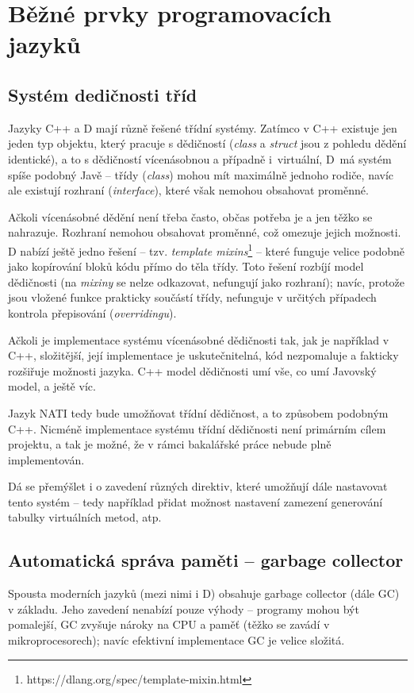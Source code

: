 \section{Běžné prvky programovacích jazyků}

\subsection{Systém dedičnosti tříd} Jazyky C++ a D mají různě řešené třídní systémy. Zatímco v C++ existuje jen jeden typ objektu, který pracuje s dědičností (\textit{class} a \textit{struct} jsou z pohledu dědění identické), a to s dědičností vícenásobnou a případně i~virtuální, D~má systém spíše podobný Javě -- třídy (\textit{class}) mohou mít maximálně jednoho rodiče, navíc ale existují rozhraní (\textit{interface}), které však nemohou obsahovat proměnné.

Ačkoli vícenásobné dědění není třeba často, občas potřeba je a jen těžko se nahrazuje. Rozhraní nemohou obsahovat proměnné, což omezuje jejich možnosti. D nabízí ještě jedno řešení -- tzv. \textit{template mixins}\footnote{https://dlang.org/spec/template-mixin.html} -- které funguje velice podobně jako kopírování bloků kódu přímo do těla třídy. Toto řešení rozbíjí model dědičnosti (na \textit{mixiny} se nelze odkazovat, nefungují jako rozhraní); navíc, protože jsou vložené funkce prakticky součástí třídy, nefunguje v určitých případech kontrola přepisování (\textit{overridingu}).

Ačkoli je implementace systému vícenásobné dědičnosti tak, jak je například v C++, složitější, její implementace je uskutečnitelná, kód nezpomaluje a fakticky rozšiřuje možnosti jazyka. C++ model dědičnosti umí vše, co umí Javovský model, a ještě víc.

Jazyk NATI tedy bude umožňovat třídní dědičnost, a to způsobem podobným C++. Nicméně implementace systému třídní dědičnosti není primárním cílem projektu, a tak je možné, že v rámci bakalářské práce nebude plně implementován.

Dá se přemýšlet i o zavedení různých direktiv, které umožňují dále nastavovat tento systém -- tedy například přidat možnost nastavení zamezení generování tabulky virtuálních metod, atp.

\subsection{Automatická správa paměti -- garbage collector}
Spousta moderních jazyků (mezi nimi i D) obsahuje garbage collector (dále GC) v základu. Jeho zavedení nenabízí pouze výhody -- programy mohou být pomalejší, GC zvyšuje nároky na CPU a paměť (těžko se zavádí v mikroprocesorech); navíc efektivní implementace GC je velice složitá.

